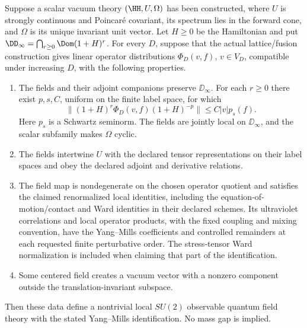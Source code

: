 \begin{theorem}\label{thm:completion}
Suppose a scalar vacuum theory \((\HH,U,\Omega)\) has been constructed,
where \(U\) is strongly continuous and Poincar\'e covariant, its spectrum
lies in the forward cone, and \(\Omega\) is its unique invariant unit
vector. Let \(H\geq0\) be the Hamiltonian and put
\(\DD_\infty=\bigcap_{r\geq0}\Dom(1+H)^r\).
For every \(D\), suppose that the actual lattice/fusion construction
gives linear operator distributions \(\Phi_D(v,f)\), \(v\in V_D\),
compatible under increasing \(D\), with the following properties.
\begin{enumerate}[label=(\alph*)]
 \item The fields and their adjoint companions preserve \(\DD_\infty\).
 For each \(r\geq0\) there exist \(p,s,C\), uniform on the finite label
 space, for which
 \begin{equation}
 \|(1+H)^r\Phi_D(v,f)(1+H)^{-p}\|
       \leq C|v|p_s(f). \label{eq:energybound}
 \end{equation}
 Here \(p_s\) is a Schwartz seminorm. The fields are jointly local on
 \(\DD_\infty\), and the scalar subfamily makes \(\Omega\) cyclic.
 \item The fields intertwine \(U\) with the declared tensor
 representations on their label spaces and obey the declared adjoint
 and derivative relations.
 \item The field map is nondegenerate on the chosen operator quotient
 and satisfies the claimed renormalized local identities, including
 the equation-of-motion/contact and Ward identities in their declared
 schemes. Its ultraviolet correlations and local operator products,
 with the fixed coupling and mixing convention, have the Yang--Mills
 coefficients and controlled remainders at each requested finite
 perturbative order. The stress-tensor Ward normalization is included
 when claiming that part of the identification.
 \item Some centered field creates a vacuum vector with a nonzero
 component outside the translation-invariant subspace.
\end{enumerate}
Then these data define a nontrivial local \(SU(2)\) observable quantum
field theory with the stated Yang--Mills identification. No mass gap
is implied.
\end{theorem}

